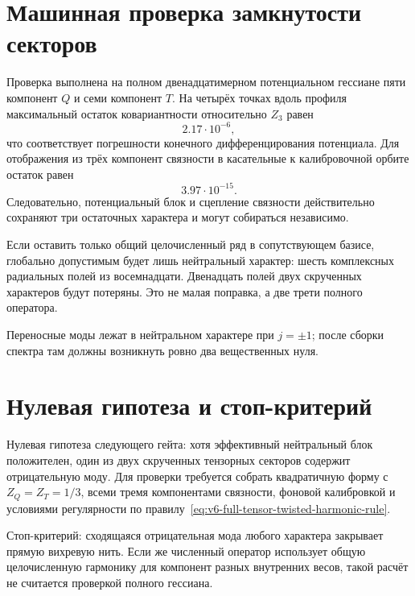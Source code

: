 \section{Машинная проверка замкнутости секторов}

Проверка выполнена на полном двенадцатимерном потенциальном гессиане
пяти компонент $Q$ и семи компонент $T$. На четырёх точках вдоль профиля
максимальный остаток ковариантности относительно $Z_3$ равен
\begin{equation}
 2.17\cdot10^{-6},
\end{equation}
что соответствует погрешности конечного дифференцирования потенциала.
Для отображения из трёх компонент связности в касательные к калибровочной
орбите остаток равен
\begin{equation}
 3.97\cdot10^{-15}.
\end{equation}
Следовательно, потенциальный блок и сцепление связности действительно
сохраняют три остаточных характера и могут собираться независимо.

Если оставить только общий целочисленный ряд в сопутствующем базисе, глобально
допустимым будет лишь нейтральный характер: шесть комплексных радиальных
полей из восемнадцати. Двенадцать полей двух скрученных характеров будут
потеряны. Это не малая поправка, а две трети полного оператора.

Переносные моды лежат в нейтральном характере при $j=\pm1$; после сборки
спектра там должны возникнуть ровно два вещественных нуля.

\section{Нулевая гипотеза и стоп-критерий}

Нулевая гипотеза следующего гейта: хотя эффективный нейтральный блок
положителен, один из двух скрученных тензорных секторов содержит отрицательную
моду. Для проверки требуется собрать квадратичную форму с
$Z_Q=Z_T=1/3$, всеми тремя компонентами связности, фоновой калибровкой и
условиями регулярности по правилу~\eqref{eq:v6-full-tensor-twisted-harmonic-rule}.

Стоп-критерий: сходящаяся отрицательная мода любого характера закрывает
прямую вихревую нить. Если же численный оператор использует общую
целочисленную гармонику для компонент разных внутренних весов, такой расчёт
не считается проверкой полного гессиана.

